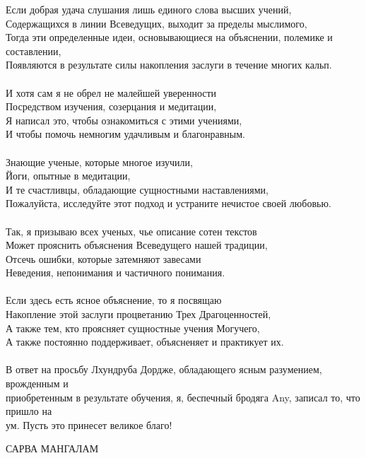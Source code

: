 \begin{siderules}
Если добрая удача слушания лишь единого слова высших учений,\\
Содержащихся в линии Всеведущих, выходит за пределы мыслимого,\\
Тогда эти определенные идеи, основывающиеся на объяснении, полемике и составлении,\\
Появляются в результате силы накопления заслуги в течение многих кальп.\\
\\
И хотя сам я не обрел не малейшей уверенности\\
Посредством изучения, созерцания и медитации,\\
Я написал это, чтобы ознакомиться с этими учениями,\\
И чтобы помочь немногим удачливым и благонравным.\\
\\
Знающие ученые, которые многое изучили,\\
Йоги, опытные в медитации,\\
И те счастливцы, обладающие сущностными наставлениями,\\
Пожалуйста, исследуйте этот подход и устраните нечистое своей любовью.\\
\\
Так, я призываю всех ученых, чье описание сотен текстов\\
Может прояснить объяснения Всеведущего нашей традиции,\\
Отсечь ошибки, которые затемняют завесами\\
Неведения, непонимания и частичного понимания.\\
\\
Если здесь есть ясное объяснение, то я посвящаю\\
Накопление этой заслуги процветанию Трех Драгоценностей,\\
А также тем, кто проясняет сущностные учения Могучего,\\
А также постоянно поддерживает, объясненяет и практикует их.\\
\\
В ответ на просьбу Лхундруба Дордже, обладающего ясным разумением, врожденным и\\
приобретенным в результате обучения, я, беспечный бродяга Any, записал то, что пришло на\\
ум. Пусть это принесет великое благо!\\
\end{siderules}

\begin{center}
САРВА МАНГАЛАМ
\end{center}

